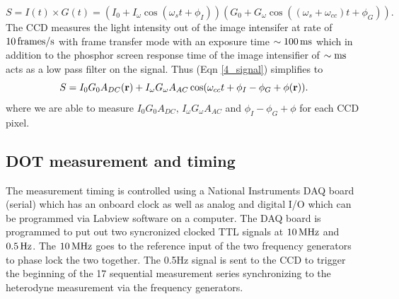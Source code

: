 \begin{equation}
S = I(t) \times G(t) = (I_{0} + I_{\omega}\cos(\omega_s t+\phi_I))(G_{0} +G_{\omega}\cos((\omega_s+\omega_{cc})t+\phi_G)).
\label{4_signal}
\end{equation}
The CCD measures the light intensity out of the image intensifer at rate of $10\, {\rm frames/s}$ with frame transfer mode with an exposure time $\sim100\, {\rm ms}$ which in addition to the phosphor screen response time of the image intensifier of $\sim{\rm ms}$ acts as a low pass filter on the signal. Thus (Eqn \ref{4_signal}) simplifies to
\begin{equation}
\label{eqn:heterodyne}
S  = I_{0}G_{0}A_{DC}({\bf r}) + I_{\omega}G_{\omega}A_{AC}\cos(\omega_{cc}t+\phi_I-\phi_G+\phi({\bf r})).
\end{equation}
where we are able to measure $I_{0}G_{0}A_{DC},\,I_{\omega}G_{\omega}A_{AC}$ and $\phi_I-\phi_G+\phi$ for each CCD pixel.

\subsection{DOT measurement and timing}
The measurement timing is controlled using a National Instruments DAQ board (serial) which has an onboard clock as well as analog and digital I/O which can be programmed via Labview software on a computer. The DAQ board is programmed to put out two syncronized clocked TTL signals at $10\,{\rm MHz}$ and $0.5\,{\rm Hz}$. The $10\,{\rm MHz}$ goes to the reference input of the two frequency generators to phase lock the two together. The 0.5Hz signal is sent to the CCD to trigger the beginning of the 17 sequential measurement series synchronizing to the heterodyne measurement via the frequency generators.

